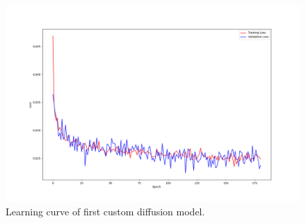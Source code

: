 \documentclass[12pt]{article}
\begin{document}
\begin{figure}[hp]
    \includegraphics[scale=0.4, center]{figures/learning_curve_10.png}
    \caption{Learning curve of first custom diffusion model.}
    \label{fig:learning_curve_10}
\end{figure}
\end{document}
